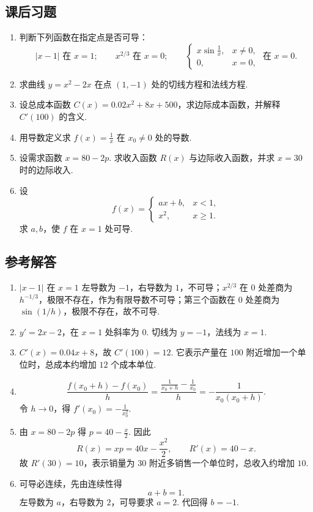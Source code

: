 \documentclass[fontset=fandol]{ctexart}
\begin{document}
\subsection{课后习题}
\begin{enumerate}[label=\textbf{练习\arabic*.},leftmargin=2.2em]
\item 判断下列函数在指定点是否可导：
\[
|x-1|\text{ 在 }x=1;\qquad
x^{2/3}\text{ 在 }x=0;\qquad
\begin{cases}x\sin\frac1x,&x\neq0,\\0,&x=0,\end{cases}\text{ 在 }x=0.
\]
\item 求曲线 $y=x^2-2x$ 在点 $(1,-1)$ 处的切线方程和法线方程.
\item 设总成本函数 $C(x)=0.02x^2+8x+500$，求边际成本函数，并解释 $C'(100)$ 的含义.
\item 用导数定义求 $f(x)=\frac1x$ 在 $x_0\neq0$ 处的导数.
\item 设需求函数 $x=80-2p$. 求收入函数 $R(x)$ 与边际收入函数，并求 $x=30$ 时的边际收入.
\item 设
\[
f(x)=
\begin{cases}
ax+b,&x<1,\\
x^2,&x\geq1.
\end{cases}
\]
求 $a,b$，使 $f$ 在 $x=1$ 处可导.
\end{enumerate}

\subsection{参考解答}
\begin{enumerate}[label=\textbf{练习\arabic*.},leftmargin=2.2em]
\item $|x-1|$ 在 $x=1$ 左导数为 $-1$，右导数为 $1$，不可导；$x^{2/3}$ 在 $0$ 处差商为 $h^{-1/3}$，极限不存在，作为有限导数不可导；第三个函数在 $0$ 处差商为 $\sin(1/h)$，极限不存在，故不可导.
\item $y'=2x-2$，在 $x=1$ 处斜率为 $0$. 切线为 $y=-1$，法线为 $x=1$.
\item $C'(x)=0.04x+8$，故 $C'(100)=12$. 它表示产量在 $100$ 附近增加一个单位时，总成本约增加 $12$ 个成本单位.
\item
\[
\frac{f(x_0+h)-f(x_0)}{h}
=\frac{\frac1{x_0+h}-\frac1{x_0}}{h}
=-\frac1{x_0(x_0+h)}.
\]
令 $h\to0$，得 $f'(x_0)=-\frac1{x_0^2}$.
\item 由 $x=80-2p$ 得 $p=40-\frac{x}{2}$. 因此
\[
R(x)=xp=40x-\frac{x^2}{2},\qquad R'(x)=40-x.
\]
故 $R'(30)=10$，表示销量为 $30$ 附近多销售一个单位时，总收入约增加 $10$.
\item 可导必连续，先由连续性得
\[
a+b=1.
\]
左导数为 $a$，右导数为 $2$，可导要求 $a=2$. 代回得 $b=-1$.
\end{enumerate}
\end{document}
